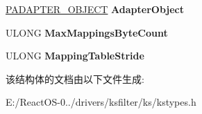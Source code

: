 \begin{DoxyCompactItemize}
\mbox{\label{struct_k_s_i_d_e_v_i_c_e___h_e_a_d_e_r_ab699d00d4da61762c84d50f86fc88082}} 
\hyperlink{struct___d_m_a___a_d_a_p_t_e_r}{P\+A\+D\+A\+P\+T\+E\+R\+\_\+\+O\+B\+J\+E\+CT} {\bfseries Adapter\+Object}
\item 
\mbox{\label{struct_k_s_i_d_e_v_i_c_e___h_e_a_d_e_r_a715cb6e464e3bac2d397d3bc70cf5b1f}} 
U\+L\+O\+NG {\bfseries Max\+Mappings\+Byte\+Count}
\item 
\mbox{\label{struct_k_s_i_d_e_v_i_c_e___h_e_a_d_e_r_a9b033beddc7fd123d9d8e4c3e037d420}} 
U\+L\+O\+NG {\bfseries Mapping\+Table\+Stride}
\end{DoxyCompactItemize}


该结构体的文档由以下文件生成\+:\begin{DoxyCompactItemize}
\item 
E\+:/\+React\+O\+S-\/0../drivers/ksfilter/ks/kstypes.\+h\end{DoxyCompactItemize}
